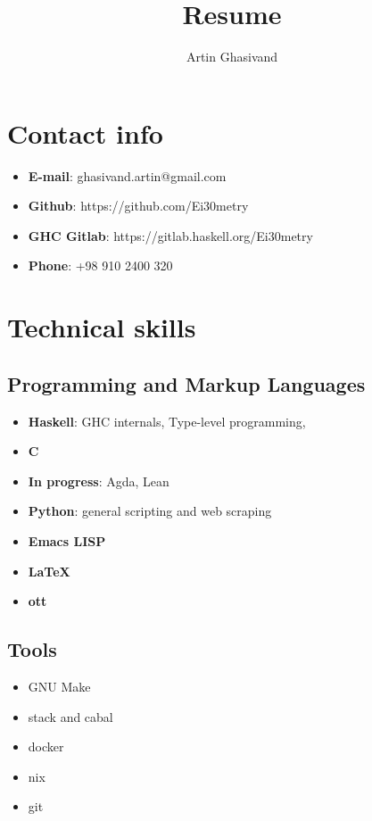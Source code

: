 \documentclass{article}
\renewcommand{\maketitle}{
  \begin{center} \huge{\theauthor}

    \vspace{.25em}

  \end{center} }
\begin{document}
\title{Resume} \author{Artin Ghasivand}
\maketitle

\section{Contact info}
\begin{itemize}
\item \textbf{E-mail}: ghasivand.artin@gmail.com
\item \textbf{Github}: https://github.com/Ei30metry
\item \textbf{GHC Gitlab}: https://gitlab.haskell.org/Ei30metry
\item \textbf{Phone}: +98 910 2400 320

\end{itemize}

\newpage

\section{Technical skills}

\subsection{Programming and Markup Languages}

\begin{itemize}
\item \textbf{Haskell}: GHC internals, Type-level programming,
\item \textbf{C}
\item \textbf{In progress}: Agda, Lean
\item \textbf{Python}: general scripting and web scraping
\item \textbf{Emacs LISP}
\item \textbf{\LaTeX}
\item \textbf{ott}
\end{itemize}

\subsection{Tools}

\begin{itemize}
\item GNU Make
\item stack and cabal
\item docker
\item nix
\item git
\end{itemize}
\end{document}
